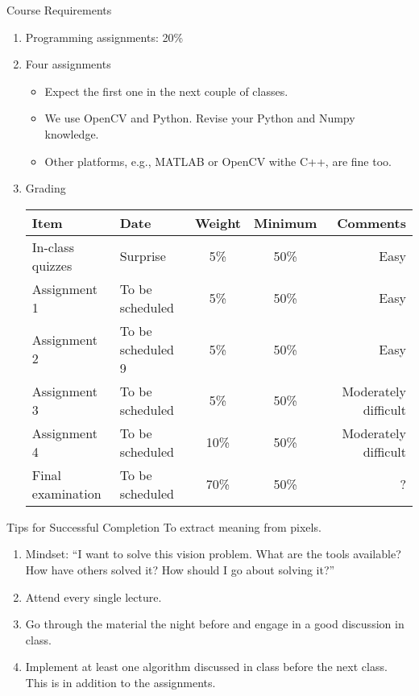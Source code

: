 \begin{frame}{Course Requirements}
    \begin{enumerate}
        \item Programming assignments: 20\%
        \item Four assignments
        \begin{itemize}
            \item Expect the first one in the next couple of classes.
            \item We use OpenCV and Python. Revise your Python and Numpy knowledge.
            \item Other platforms,  e.g., MATLAB or OpenCV withe C++, are fine too.
        \end{itemize}
        \item Grading
        \begin{tabular}{@{}llccr@{}}
          \toprule
          Item   & Date& Weight& Minimum& Comments\\
          \midrule
          In-class quizzes &  Surprise & 5\% & 50\%& Easy\\
          \hline
          Assignment 1 &  To be scheduled & 5\% & 50\%& Easy\\
          \hline
          Assignment 2 & To be scheduled 9& 5\% & 50\%& Easy\\
          \hline
          Assignment 3&  To be scheduled&5\% & 50\%& Moderately difficult\\
          \hline
          Assignment 4&  To be scheduled &10\% & 50\%& Moderately difficult\\
          \hline
          Final examination & To be scheduled & 70\% & 50\%&?\\
          \bottomrule
        \end{tabular}
    \end{enumerate}
\end{frame}


\begin{frame}{Tips for Successful Completion}
    To extract meaning from pixels.
    \begin{enumerate}
      \item Mindset: ``I want to solve this vision problem. What are the tools available? How have others solved it? How should I go about solving it?''
      \item Attend every single lecture.
      \item Go through the material the night before and engage in a good discussion in class.
      \item Implement at least one algorithm discussed in class before the next class. This is in addition to the assignments.
    \end{enumerate}
\end{frame}

